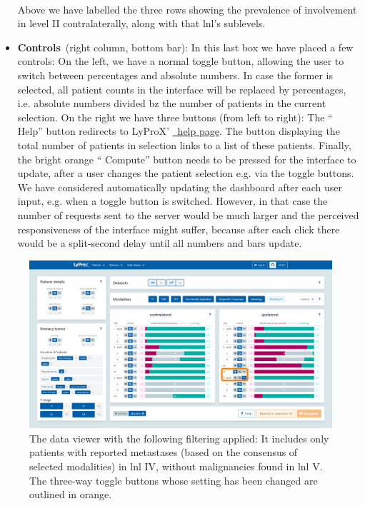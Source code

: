 \documentclass[\relativeRoot/main.tex]{subfiles}
\begin{document}
\begin{itemize}
\\
    [3mm]
    Above we have labelled the three rows showing the prevalence of involvement in level II contralaterally, along with that \gls{lnl}'s sublevels.
    \item \textbf{Controls}~(right column, bottom bar): In this last box we have placed a few controls: On the left, we have a normal toggle button, allowing the user to switch between percentages and absolute numbers. In case the former is selected, all patient counts in the interface will be replaced by percentages, i.e. absolute numbers divided bz the number of patients in the current selection. On the right we have three buttons (from left to right): The `` Help'' button redirects to LyProX' \href{https://lyprox.org/dashboard/help}{~help page}. The button displaying the total number of patients in selection links to a list of these patients. Finally, the bright orange `` Compute'' button needs to be pressed for the interface to update, after a user changes the patient selection e.g. via the toggle buttons. We have considered automatically updating the dashboard after each user input, e.g. when a toggle button is switched. However, in that case the number of requests sent to the server would be much larger and the perceived responsiveness of the interface might suffer, because after each click there would be a split-second delay until all numbers and bars update.
\end{itemize}

\begin{figure}
    \centering
    \includegraphics[width=1.0\textwidth, frame]{figures/data_viewer_lnl_example.png}
    \caption[
        The data viewer showing a scenario of two involved LNLs
    ]{
        The data viewer with the following filtering applied: It includes only patients with reported metastases (based on the consensus of selected modalities) in \gls{lnl} IV, without malignancies found in \gls{lnl} V. The three-way toggle buttons whose setting has been changed are outlined in orange.
    }
    \label{fig:lyprox:data_viewer_lnl_example}
\end{figure}
\end{document}
